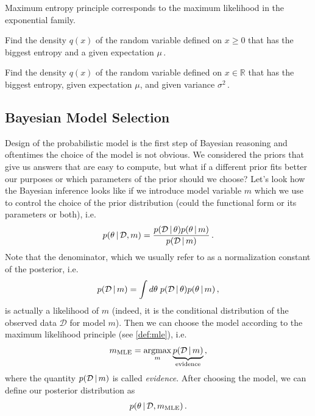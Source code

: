 \begin{theorem}
    Maximum entropy principle corresponds to the maximum likelihood in the exponential family.
\end{theorem}

\begin{exercise}
    Find the density $q(x)$ of the random variable defined on $x \geq 0$ that has the biggest entropy and a given expectation $\mu$\,.
\end{exercise}

\begin{exercise}
    Find the density $q(x)$ of the random variable defined on $x \in \mathbb{R}$ that has the biggest entropy, given expectation $\mu$, and given variance $\sigma^2$\,.
\end{exercise}

\subsection{Bayesian Model Selection}
Design of the probabilistic model is the first step of Bayesian reasoning and oftentimes the choice of the model is not obvious.
We considered the priors that give us answers that are easy to compute, but what if a different prior fits better our purposes or which parameters of the prior should we choose? 
Let's look how the Bayesian inference looks like if we introduce model variable $m$ which we use to control the choice of the prior distribution (could the functional form or its parameters or both), i.e.
\begin{align}
    p(\theta\,|\, \mathcal{D}, m) = \frac{p(\mathcal{D}\,|\,\theta)p(\theta\,|\, m)}{p(\mathcal{D}\,|\, m)}\,.
\end{align}
Note that the denominator, which we usually refer to as a normalization constant of the posterior, i.e.
\begin{align}
    p(\mathcal{D}\,|\, m) = \int d\theta\;p(\mathcal{D}\,|\,\theta)p(\theta\,|\, m)\,,
\end{align}
is actually a likelihood of $m$ (indeed, it is the conditional distribution of the observed data $\mathcal{D}$ for model $m$).
Then we can choose the model according to the maximum likelihood principle (see \cref{def:mle}), i.e.
\begin{align}
    m_{\text{MLE}} = \operatorname*{argmax}_m \underbrace{p(\mathcal{D}\,|\, m)}_{\text{evidence}}\,,
\end{align}
where the quantity $p(\mathcal{D}\,|\, m)$ is called \textit{evidence}.
After choosing the model, we can define our posterior distribution as
\begin{align}
    p(\theta\,|\, \mathcal{D}, m_{\text{MLE}})\,.
\end{align}

